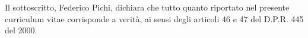 \documentclass[
  usegeometry%
]{scrartcl}
\newcommand{\MarginText}[1]{\marginpar{\raggedleft\itshape\small#1}} %
\newcommand{\Description}[1]{\hangindent=2em\hangafter=0\noindent\raggedright\footnotesize{#1}\par\normalsize\vspace{1em}} %
\begin{document}
\begin{cv}{}
Il sottoscritto, Federico Pichi, dichiara che tutto quanto riportato nel presente curriculum vitae corrisponde a verità, ai sensi degli articoli 46
e 47 del D.P.R. 445 del 2000.

%
%
%
%
%
%
%
%
%

\end{cv}
\end{document}
